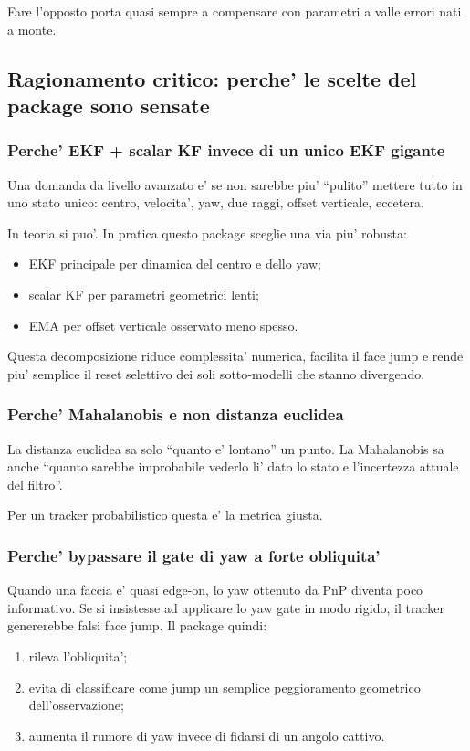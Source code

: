 \documentclass[11pt,a4paper]{article}
\begin{document}
Fare l'opposto porta quasi sempre a compensare con parametri a valle errori nati a monte.

\subsection{Ragionamento critico: perche' le scelte del package sono sensate}

\subsubsection{Perche' EKF + scalar KF invece di un unico EKF gigante}

Una domanda da livello avanzato e' se non sarebbe piu' ``pulito'' mettere tutto in uno stato unico: centro, velocita', yaw, due raggi, offset verticale, eccetera.

In teoria si puo'. In pratica questo package sceglie una via piu' robusta:
\begin{itemize}[leftmargin=1.4em]
  \item EKF principale per dinamica del centro e dello yaw;
  \item scalar KF per parametri geometrici lenti;
  \item EMA per offset verticale osservato meno spesso.
\end{itemize}

Questa decomposizione riduce complessita' numerica, facilita il face jump e rende piu' semplice il reset selettivo dei soli sotto-modelli che stanno divergendo.

\subsubsection{Perche' Mahalanobis e non distanza euclidea}

La distanza euclidea sa solo ``quanto e' lontano'' un punto. La Mahalanobis sa anche ``quanto sarebbe improbabile vederlo li' dato lo stato e l'incertezza attuale del filtro''.

Per un tracker probabilistico questa e' la metrica giusta.

\subsubsection{Perche' bypassare il gate di yaw a forte obliquita'}

Quando una faccia e' quasi edge-on, lo yaw ottenuto da PnP diventa poco informativo. Se si insistesse ad applicare lo yaw gate in modo rigido, il tracker genererebbe falsi face jump. Il package quindi:
\begin{enumerate}[leftmargin=1.4em]
  \item rileva l'obliquita';
  \item evita di classificare come jump un semplice peggioramento geometrico dell'osservazione;
  \item aumenta il rumore di yaw invece di fidarsi di un angolo cattivo.
\end{enumerate}
\end{document}
